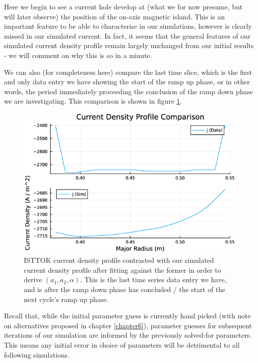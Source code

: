 Here we begin to see a current hole develop at (what we for now presume, but will later 
observe) the position of the on-axis magnetic island. This is an important feature to be 
able to characterise in our simulations, however is clearly missed in our simulated current. In fact, 
it seems that the general features of our simulated current density profile remain largely unchanged 
from our initial results - we will comment on why this is so in a minute.

We can also (for completeness here) compare the last time slice, which is the first and only 
data entry we have showing the start of the ramp up phase, or in other words, the period immediately 
proceeding the conclusion of the ramp down phase we are investigating. This comparison is shown 
in figure \ref{comparison-current-20-unfiltered}.
\begin{figure}[h!]
    \centering
    \includegraphics[scale=0.7]{imgs/c5/comparison-current-20-unfiltered.png}
    \caption{ISTTOK current density profile contrasted with our simulated current density profile
    after fitting against the former in order to derive $(a_1, a_2, \alpha)$. This is the last 
    time series data entry we have, and is after the ramp down phase has concluded / the 
    start of the next cycle's ramp up phase.}
    \label{comparison-current-20-unfiltered}
\end{figure}\newpage

Recall that, while the initial parameter guess is currently hand picked (with note on 
alternatives proposed in chapter \ref{chapter6}), parameter guesses for subsequent iterations of our 
simulation are informed by the previously solved-for parameters. This means any initial error in choice of parameters 
will be detrimental to all following simulations.

